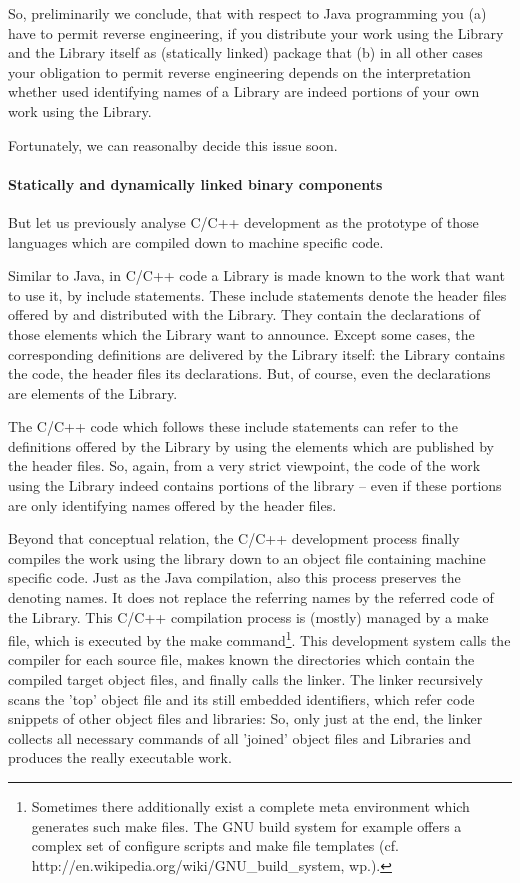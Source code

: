 So, preliminarily we conclude, that with respect to Java programming you (a)
have to permit reverse engineering, if you distribute your work using the
Library and the Library itself as (statically linked) package that (b) in all
other cases your obligation to permit reverse engineering depends on the
interpretation whether used identifying names of a Library are indeed portions
of your own work using the Library.

Fortunately, we can reasonalby decide this issue soon.

\paragraph{Statically and dynamically linked binary components}

But let us previously analyse C/C++ development as the prototype of those
languages which are compiled down to machine specific code. 

Similar to Java, in C/C++ code a Library is made known to the work that want to
use it, by include statements. These include statements denote the header files
offered by and distributed with the Library. They contain the declarations of
those elements which the Library want to announce. Except some cases, the
corresponding definitions are delivered by the Library itself: the Library
contains the code, the header files its declarations. But, of course, even the 
declarations are elements of the Library. 

The C/C++ code which follows these include statements can refer to the
definitions offered by the Library by using the elements which are published by
the header files. So, again, from a very strict viewpoint, the code of the work
using the Library indeed contains portions of the library -- even if these
portions are only identifying names offered by the header files.

Beyond that conceptual relation, the C/C++ development process finally compiles
the work using the library down to an object file containing machine specific
code. Just as the Java compilation, also this process preserves the denoting
names. It does not replace the referring names by the referred code of the
Library. This C/C++ compilation process is (mostly) managed by a make file,
which is executed by the make command\footnote{Sometimes there additionally
exist a complete meta environment which generates such make files. The GNU build
system for example offers a complex set of configure scripts and make file
templates (cf. http://en.wikipedia.org/wiki/GNU\_build\_system, wp.).}. This
development system calls the compiler for each source file, makes known the
directories which contain the compiled target object files, and finally calls
the linker. The linker recursively scans the 'top' object file and its still
embedded identifiers, which refer code snippets of other object files and
libraries: So, only just at the end, the linker collects all necessary commands
of all 'joined' object files and Libraries and produces the really executable
work.

